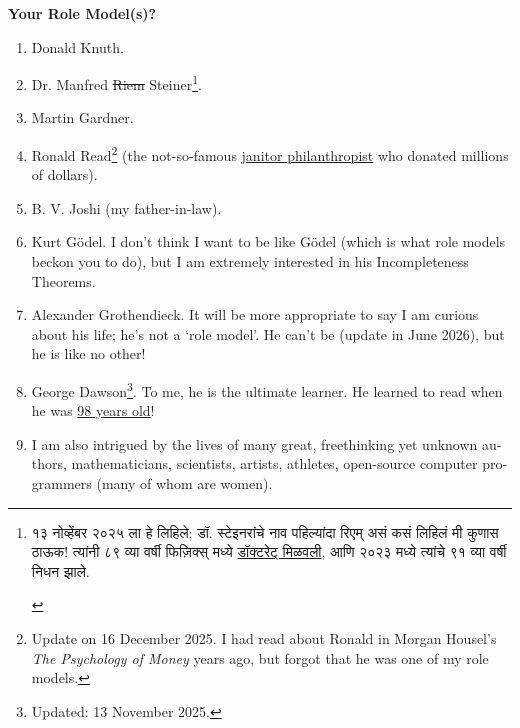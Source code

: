 \documentclass[17pt]{extarticle}  %
\begin{document}
\begin{enumerate}
\begin{english}
\item 
\textbf{Your Role Model(s)?}\\
\begin{enumerate}
\item Donald Knuth.
\item Dr. Manfred \sout{Riem} Steiner\footnote{\begin{marathi}१३ नोव्हेंबर २०२५ ला हे लिहिले; डॉ. स्टेइनरांचे नाव पहिल्यांदा रिएम् असं कसं लिहिलं मी कुणास ठाऊक! त्यांनी ८९ व्या वर्षी फिज़िक्स् मध्ये \href{https://en.wikipedia.org/wiki/Manfred_Steiner_(physician)}{डॉक्टरेट् मिळवली}, आणि २०२३ मध्ये त्यांचे ९१ व्या वर्षी निधन झाले.\end{marathi}}.
\item Martin Gardner.
\item Ronald Read\footnote{Update on 16 December 2025. I had read about Ronald in Morgan Housel's \textit{The Psychology of Money} years ago, but forgot that he was one of my role models.} (the not-so-famous \href{https://en.wikipedia.org/wiki/Ronald_Read_(philanthropist)}{janitor philanthropist} who donated millions of dollars).
\item B. V. Joshi (my father-in-law).
\item Kurt G\"odel. I don't think I want to be like G\"odel (which is what role models beckon you to do), but I am extremely interested in his Incompleteness Theorems.
\item Alexander Grothendieck. It will be more appropriate to say I am curious about his life; he's not a \enquote*{role model}. He can't be (update in June 2026), but he is like no other!
\item George Dawson\footnote{Updated: 13 November 2025.}. To me, he is the ultimate learner. He learned to read when he was \href{https://en.wikipedia.org/wiki/George_Dawson_(author)}{98 years old}!
\item I am also intrigued by the lives of many great, freethinking yet unknown authors, mathematicians, scientists, artists, athletes, open-source computer programmers (many of whom are women).
\end{enumerate}


\end{english}
\end{enumerate}
\end{document}
